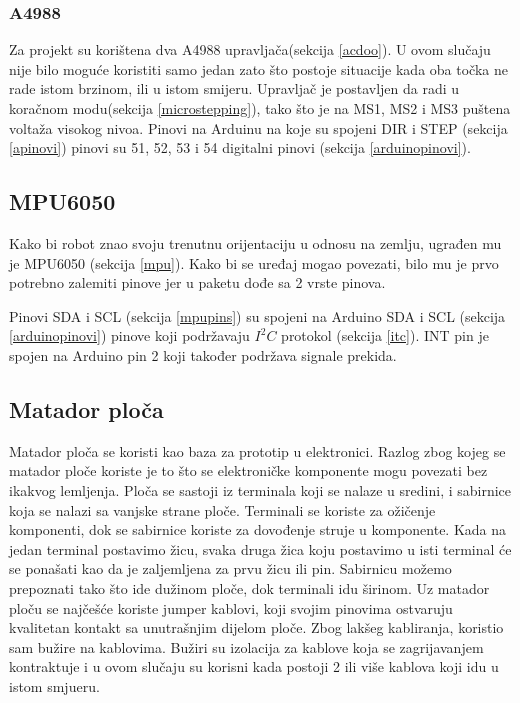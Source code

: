 \documentclass[../Document.tex]{subfiles}
\begin{document}
\subsubsection{A4988}
Za projekt su korištena dva A4988 upravljača(sekcija \ref{acdoo}). U ovom slučaju nije bilo moguće koristiti samo jedan zato što postoje situacije kada oba točka ne rade istom brzinom, ili u istom smijeru. Upravljač je postavljen da radi u  koračnom modu(sekcija \ref{microstepping}), tako što je na MS1, MS2 i MS3 puštena voltaža visokog nivoa. Pinovi na Arduinu na koje su spojeni DIR i STEP (sekcija \ref{apinovi}) pinovi su 51, 52, 53 i 54 digitalni pinovi (sekcija \ref{arduinopinovi}).

\subsection{MPU6050}
Kako bi robot znao svoju trenutnu orijentaciju u odnosu na zemlju, ugrađen mu je MPU6050 (sekcija \ref{mpu}). Kako bi se uređaj mogao povezati, bilo mu je prvo potrebno zalemiti pinove jer u paketu dođe sa 2 vrste pinova.


\noindent Pinovi SDA i SCL (sekcija \ref{mpupins}) su spojeni na Arduino SDA i SCL (sekcija \ref{arduinopinovi}) pinove koji podržavaju {$I^2C$} protokol (sekcija \ref{itc}).
INT pin je spojen na Arduino pin 2 koji također podržava signale prekida.

\subsection{Matador ploča}
Matador ploča se koristi kao baza za prototip u elektronici. Razlog zbog kojeg se matador ploče koriste je to što se elektroničke komponente mogu povezati bez ikakvog lemljenja. Ploča se sastoji iz terminala koji se nalaze u sredini, i sabirnice koja se nalazi sa vanjske strane ploče. Terminali se koriste za ožičenje komponenti, dok se sabirnice koriste za dovođenje struje u komponente. Kada na jedan terminal postavimo žicu, svaka druga žica koju postavimo u isti terminal će se ponašati kao da je zaljemljena za prvu žicu ili pin. Sabirnicu možemo prepoznati tako što ide dužinom ploče, dok terminali idu širinom. Uz matador ploču se najčešće koriste jumper kablovi, koji svojim pinovima ostvaruju kvalitetan kontakt sa unutrašnjim dijelom ploče. Zbog lakšeg kabliranja, koristio sam bužire na kablovima. Bužiri su izolacija za kablove koja se zagrijavanjem kontraktuje i u ovom slučaju su korisni kada postoji 2 ili više kablova koji idu u istom smjueru.
\end{document}
